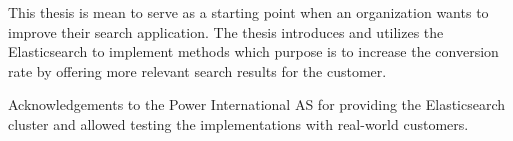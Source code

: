 
This thesis is mean to serve as a starting point when an organization
wants to improve their search application. 
The thesis introduces and utilizes the Elasticsearch to implement 
methods which purpose is to increase the conversion rate by 
offering more relevant search results for the customer.


Acknowledgements to the Power International AS for providing the Elasticsearch cluster 
and allowed testing the implementations with real-world customers.

